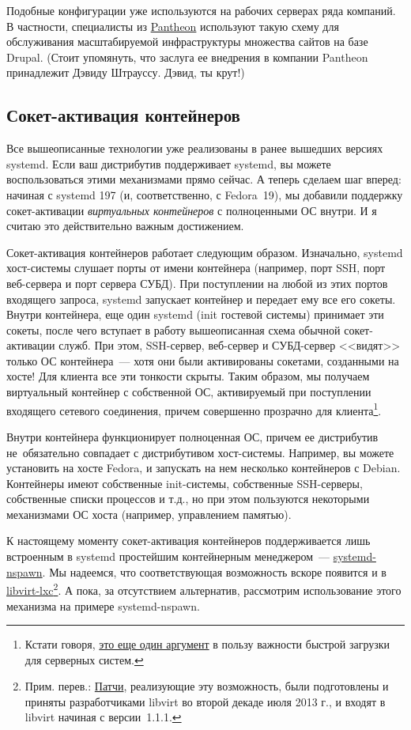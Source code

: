 \documentclass[10pt,oneside,a4paper]{article}
\begin{document}
Подобные конфигурации уже используются на рабочих серверах ряда компаний. В
частности, специалисты из \href{https://www.getpantheon.com/}{Pantheon}
используют такую схему для обслуживания масштабируемой инфраструктуры множества
сайтов на базе Drupal. (Стоит упомянуть, что заслуга ее внедрения в компании 
Pantheon принадлежит Дэвиду Штрауссу. Дэвид, ты крут!)

\subsection{Сокет-активация контейнеров}

Все вышеописанные технологии уже реализованы в ранее вышедших версиях systemd.
Если ваш дистрибутив поддерживает systemd, вы можете воспользоваться этими
механизмами прямо сейчас. А теперь сделаем шаг вперед: начиная с
systemd 197 (и, соответственно, с Fedora~19), мы добавили поддержку
сокет-активации \emph{виртуальных контейнеров} с полноценными ОС внутри. И
я считаю это действительно важным достижением.

Сокет-активация контейнеров работает следующим образом. Изначально, systemd
хост-системы слушает порты от имени контейнера (например, порт SSH, порт
веб-сервера и порт сервера СУБД). При поступлении на любой из этих портов
входящего запроса, systemd запускает контейнер и передает ему все его сокеты.
Внутри контейнера, еще один systemd (init гостевой системы) принимает эти
сокеты, после чего вступает в работу вышеописанная схема обычной сокет-активации
служб. При этом, SSH-сервер, веб-сервер и СУБД-сервер <<видят>> только ОС
контейнера~--- хотя они были активированы сокетами, созданными на хосте! Для
клиента все эти тонкости скрыты. Таким образом, мы получаем виртуальный
контейнер с собственной ОС, активируемый при поступлении входящего сетевого
соединения, причем совершенно прозрачно для клиента\footnote{Кстати говоря,
\href{https://plus.google.com/115547683951727699051/posts/cVrLAJ8HYaP}{это еще
один аргумент} в пользу важности быстрой загрузки для серверных систем.}.

Внутри контейнера функционирует полноценная ОС, причем ее дистрибутив
не~обязательно совпадает с дистрибутивом хост-системы. Например, вы можете
установить на хосте Fedora, и запускать на нем несколько контейнеров с Debian.
Контейнеры имеют собственные init-системы, собственные SSH-серверы, собственные
списки процессов и т.д., но при этом пользуются некоторыми механизмами ОС хоста
(например, управлением памятью).

К настоящему моменту сокет-активация контейнеров поддерживается лишь встроенным
в systemd простейшим контейнерным менеджером~---
\hyperref[sec:chroots]{systemd-nspawn}. Мы надеемся, что соответствующая
возможность вскоре появится и в
\href{http://libvirt.org/drvlxc.html}{libvirt-lxc}\footnote{Прим. перев.:
\href{https://www.redhat.com/archives/libvir-list/2013-July/msg00825.html}{Патчи},
реализующие эту возможность, были подготовлены и приняты разработчиками libvirt
во второй декаде июля 2013 г., и входят в libvirt начиная с версии~1.1.1.}.  А
пока, за отсутствием альтернатив, рассмотрим использование этого механизма на
примере systemd-nspawn.
\end{document}
